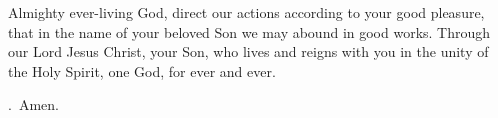 \lettrine[lines=3]{A}{}lmighty ever-living God,
direct our actions according to your good pleasure,
that in the name of your beloved Son
we may abound in good works.
Through our Lord Jesus Christ, your Son,
who lives and reigns with you in the unity of the Holy Spirit,
one God, for ever and ever. \par \Rbar.~Amen.
